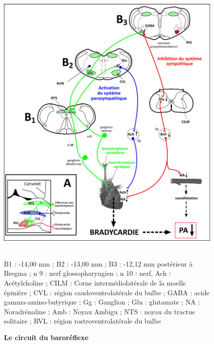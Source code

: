 \documentclass[a4paper,12pt,twoside]{report}
\begin{document}
\begin{figure}[p]

\begin{center}
 \includegraphics[width=18cm]{Figure8.jpg} 
\end{center}

\caption{\textbf{Le circuit du baroréflexe}}

{\protect\parbox[t]{18cm}{
\begin{small}
\\
B1 : -14,00 mm ; B2 : -13,00 mm ; B3 : -12,12 mm postérieur à Bregma ; n 9 : nerf glossopharyngien ; n 10 : nerf, Ach : Acétylcholine ; CILM : Corne intermédiolatérale de la moelle épinière ; CVL : région caudoventrolatérale du bulbe ; GABA : acide gamma-amino-butyrique ; Gg : Ganglion ; Glu : glutamate ; NA : Noradrénaline ; Amb : Noyau Ambigu ; NTS : noyau du tractus solitaire ; RVL : région rostroventrolatérale du bulbe
\end{small}}}

\label{Figure 8}

\end{figure}
\end{document}
